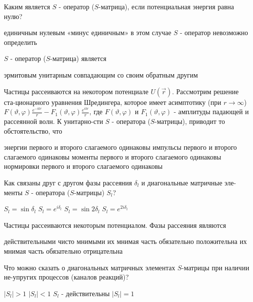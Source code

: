 \documentclass[11pt,a4paper]{exam}
\begin{document}
\begin{questions}
\question Каким является $S$ - оператор ($S$-матрица), если потенциальная энергия равна нулю?
\begin{choices}
\choice единичным         
\choice нулевым
\choice «минус единичным»    
\choice в этом случае $S$ - оператор невозможно определить
\end{choices}

\question $S$ - оператор ($S$-матрица) является
\begin{choices}
\choice эрмитовым
\choice унитарным   
\choice совпадающим со своим обратным
\choice другим
\end{choices}

\question Частицы рассеиваются на некотором потенциале $U(\vec r)$. Рассмотрим решение ста-ционарного уравнения Шредингера, которое имеет асимптотику (при $r \to \infty $) $F(\vartheta ,\varphi )\frac{{{e^{ - ikr}}}}{r} - {F_1}(\vartheta ,\varphi )\frac{{{e^{ikr}}}}{r}$, где $F(\vartheta ,\varphi )$ и ${F_1}(\vartheta ,\varphi )$ - амплитуды падающей и рассеянной волн. К унитарно-сти $S$ - оператора ($S$-матрицы), приводит то обстоятельство, что
\begin{choices}
\choice энергии первого и второго слагаемого одинаковы
\choice импульсы первого и второго слагаемого одинаковы
\choice моменты первого и второго слагаемого одинаковы
\choice нормировки первого и второго слагаемого одинаковы
\end{choices}

\question Как связаны друг с другом фазы рассеяния ${\delta _l}$ и диагональные матричные эле-менты $S$ - оператора ($S$-матрицы) ${S_l}$?
\begin{choices}
\choice ${S_l} = \sin {\delta _l}$    
\choice ${S_l} = {e^{i{\delta _l}}}$     
\choice ${S_l} = \sin 2{\delta _l}$      
\choice ${S_l} = {e^{2i{\delta _l}}}$
\end{choices}

\question Частицы рассеиваются некоторым потенциалом. Фазы рассеяния являются
\begin{choices}
\choice действительными
\choice чисто мнимыми
\choice их мнимая часть обязательно положительна
\choice их мнимая часть обязательно отрицательна
\end{choices}

\question Что можно сказать о диагональных матричных элементах $S$-матрицы при наличии не-упругих процессов (каналов реакций)?
\begin{choices}
\choice $|{S_l}| > 1$        
\choice $|{S_l}| < 1$
\choice ${S_l}$ - действительны 
\choice $|{S_l}| = 1$
\end{choices}


\end{questions}
\end{document}
